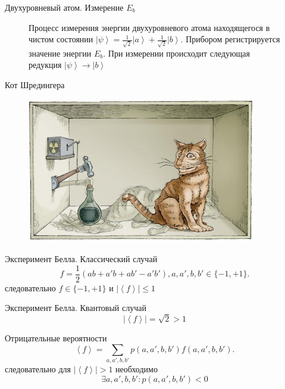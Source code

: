 \documentclass[10pt,pdf,hyperref={unicode}]{beamer}
\begin{document}
\begin{frame}{Двухуровневый атом. Измерение $E_b$}
\begin{figure}
\centering



\caption{Процесс измерения энергии двухуровневого атома находящегося в
чистом состоянии $\left|\psi\right> = 
\frac{1}{\sqrt{2}}\left|a\right> + \frac{1}{\sqrt{2}}\left|b\right>$.
Прибором регистрируется значение энергии $E_b$. При измерении
происходит следующая редукция $\left|\psi\right> \to \left|b\right>$
}
\label{fig:add:mesure_ex_b}
\end{figure}
\end{frame}

\begin{frame}{Кот Шредингера}
 \begin{figure} 
   \includegraphics[width=100mm,scale=0.5]{catshred.jpg}
  \end{figure}
\end{frame}

\begin{frame}{Эксперимент Белла. Классический случай}
\[
f = \frac{1}{2}\left(
a b + a' b + a b' - a' b'
\right), a,a',b,b' \in \{-1, +1\}.
\]
следовательно
\(
f \in \{-1, +1\}
\)
и
\(
\left|\left<f\right>\right| \le 1
\)
\end{frame}

\begin{frame}{Эксперимент Белла. Квантовый случай}
\[
\left|\left<f\right>\right| = \sqrt{2} > 1
\]
\end{frame}


\begin{frame}{Отрицательные вероятности}
\[
\left<f\right> = \sum_{a,a',b,b'} p(a,a',b,b') f(a,a',b,b').
\]
следовательно для $\left|\left<f\right>\right| > 1$ необходимо
\[
\exists a,a',b,b': p(a,a',b,b') < 0
\]
\end{frame}
\end{document}
